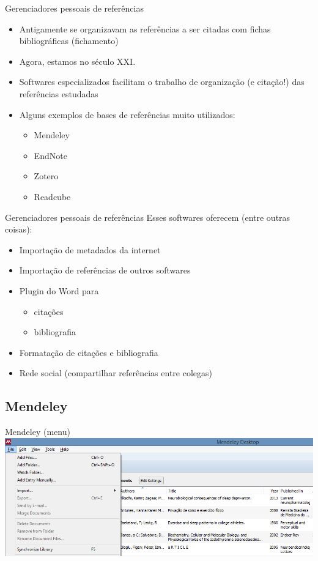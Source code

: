 \documentclass{beamer}
\begin{document}
\begin{frame}{Gerenciadores pessoais de referências}
  \begin{itemize}
  \item Antigamente se organizavam as referências a ser citadas com
    fichas bibliográficas (fichamento)
  \item Agora, estamos no século XXI.
  \item Softwares especializados facilitam o trabalho de organização
    (e citação!) das referências estudadas
  \item Alguns exemplos de bases de referências muito utilizados:
    \begin{itemize}
    \item<4-> \alert<5->{Mendeley}
    \item<4-> EndNote
    \item<4-> Zotero
    \item<4-> Readcube
    \end{itemize}
  \end{itemize}
\end{frame}

\begin{frame}{Gerenciadores pessoais de referências}
  Esses softwares oferecem (entre outras coisas):
  \begin{itemize}
  \item Importação de metadados da internet
  \item Importação de referências de outros softwares
  \item Plugin do Word para
    \begin{itemize}
    \item<3-> citações
    \item<3-> bibliografia
    \end{itemize}
  \item Formatação de citações e bibliografia
  \item Rede social (compartilhar referências entre colegas)
  \end{itemize}
\end{frame}

\subsection{Mendeley}

\begin{frame}{Mendeley (menu)}
  \includegraphics[width=1.2\textwidth]{Referencias/mendeley-menu}
\end{frame}
\end{document}
